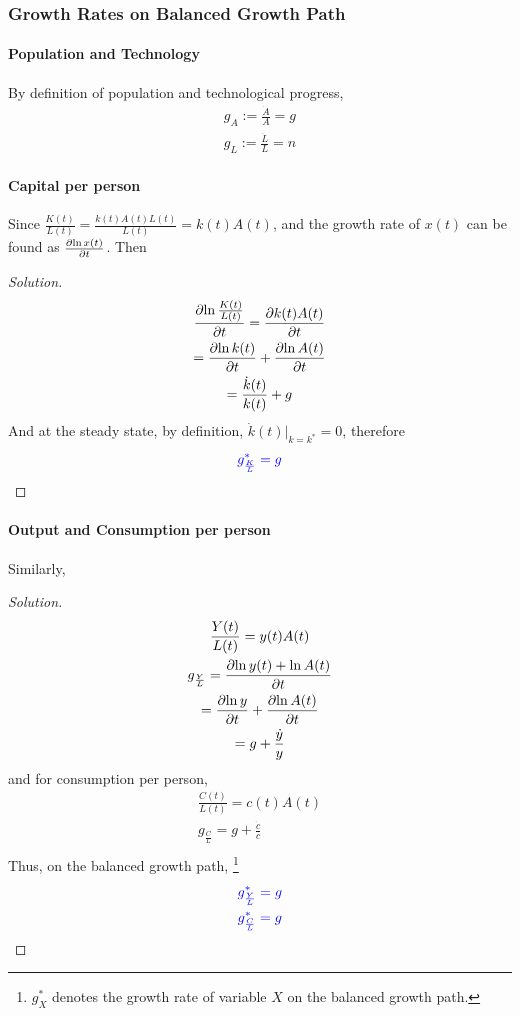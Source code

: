 \documentclass[11pt]{article}
\begin{document}
			\subsubsection{Growth Rates on Balanced Growth Path}
			\paragraph{Population and Technology} By definition of population and technological progress,
			\begin{gather}
				g_A := \frac{\dot{A}}{A} = g \\
				g_L := \frac{\dot{L}}{L} = n
			\end{gather}
			
			\paragraph{Capital per person} Since $\frac{K(t)}{L(t)} = \frac{k(t)A(t)L(t)}{L(t)} = k(t)A(t)$, and the growth rate of $x(t)$ can be found as $\frac{\partial{\ln{x(t)}}}{\partial{t}}$. Then
			\begin{proof}[Solution]
				\begin{gather*}
					\frac{\partial{\ln{\frac{K(t)}{L(t)}}}}{\partial{t}} = \frac{\partial{k(t)A(t)}}{\partial{t}} \\
					= \frac{\partial{\ln{k(t)}}}{\partial{t}} + \frac{\partial{\ln{A(t)}}}{\partial{t}} \\
					= \frac{\dot{k}(t)}{k(t)} + g \\
				\end{gather*}
				And at the steady state, by definition, $\dot{k}(t)|_{k=k^*} = 0$, therefore 
				\begin{equation}
					\textcolor{blue}{
						g_{\frac{K}{L}}^* = g
					}
				\end{equation}
			\end{proof}
			
			\paragraph{Output and Consumption per person} Similarly,
			\begin{proof}[Solution]
				\begin{gather*}
					\frac{Y(t)}{L(t)} = y(t)A(t) \\
					g_{\frac{Y}{L}} = \frac{\partial{\ln{y(t)} + \ln{A(t)}}}{\partial{t}} \\
					= \frac{\partial{\ln{y}}}{\partial{t}} + \frac{\partial{\ln{A(t)}}}{\partial{t}} \\
					= g + \frac{\dot{y}}{y}
				\end{gather*}
				and for consumption per person,
				\begin{gather*}
					\frac{C(t)}{L(t)} = c(t)A(t)\\
					g_{\frac{C}{L}} = g + \frac{\dot{c}}{c} \\
				\end{gather*}
				Thus, on the balanced growth path, \footnote{$g_X^*$ denotes the growth rate of variable $X$ on the balanced growth path.}
				\begin{gather}
					\textcolor{blue}{
						g_{\frac{Y}{L}}^* = g
					}
					\\
					\textcolor{blue}{
						g_{\frac{C}{L}}^* = g
					}
				\end{gather}
			\end{proof}
			
\end{document}
